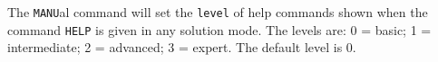 \headb

The {\tt MANU}al command will set the {\tt level} of help commands
shown when the command {\tt HELP} is given in any solution mode.
The levels are: 0 = basic; 1 = intermediate; 2 = advanced; 3 = expert.
The default level is 0.
\vfill
\eject
